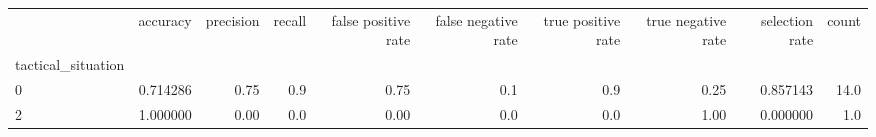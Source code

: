 \begin{tabular}{lrrrrrrrrr}
\toprule
{} &  accuracy &  precision &  recall &  false positive rate &  false negative rate &  true positive rate &  true negative rate &  selection rate &  count \\
tactical\_situation &           &            &         &                      &                      &                     &                     &                 &        \\
\midrule
0                  &  0.714286 &       0.75 &     0.9 &                 0.75 &                  0.1 &                 0.9 &                0.25 &        0.857143 &   14.0 \\
2                  &  1.000000 &       0.00 &     0.0 &                 0.00 &                  0.0 &                 0.0 &                1.00 &        0.000000 &    1.0 \\
\bottomrule
\end{tabular}

